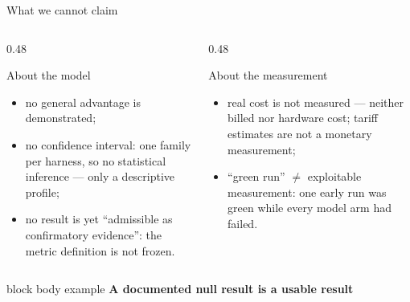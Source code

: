 \documentclass[aspectratio=169,10pt]{beamer}
\newcommand{\keymessage}[1]{%
  \begin{beamercolorbox}[rounded=true,sep=1.1ex,wd=\linewidth]{block body example}
    \centering\bfseries #1
  \end{beamercolorbox}
}
\begin{document}
\begin{frame}{What we cannot claim}

  \begin{columns}[T,onlytextwidth]
    \begin{column}{0.48\textwidth}
      \begin{alertblock}{About the model}
        \small
        \begin{itemize}
          \item no general advantage is demonstrated;
          \item no confidence interval: one family per harness, so no
                statistical inference --- only a descriptive profile;
          \item no result is yet ``admissible as confirmatory evidence'': the
                metric definition is not frozen.
        \end{itemize}
      \end{alertblock}
    \end{column}
    \begin{column}{0.48\textwidth}
      \begin{alertblock}{About the measurement}
        \small
        \begin{itemize}
          \item real cost is not measured --- neither billed nor hardware cost;
                tariff estimates are not a monetary measurement;
          \item ``green run'' $\neq$ exploitable measurement: one early run was
                green while every model arm had failed.
        \end{itemize}
      \end{alertblock}
    \end{column}
  \end{columns}

  \vspace{0.5em}
  \keymessage{A documented null result is a usable result}

\end{frame}
\end{document}
